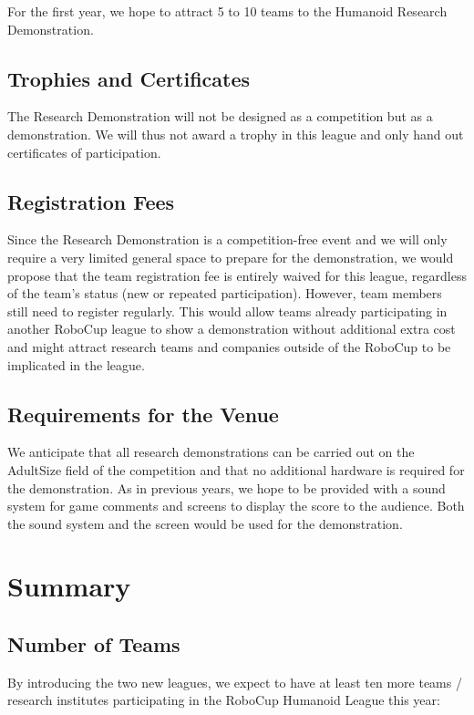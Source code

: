 \documentclass{article}
\begin{document}
For the first year, we hope to attract 5 to 10 teams to the Humanoid Research Demonstration.

\subsection{Trophies and Certificates}
The Research Demonstration will not be designed as a competition but as a demonstration. We will thus not award a trophy in this league and only hand out certificates of participation. 

\subsection{Registration Fees}

Since the Research Demonstration is a competition-free event and we will only
require a very limited general space to prepare for the demonstration,
we would propose that the team registration fee is entirely waived for this
league,
regardless of the team's status (new or repeated participation).
However, team members still need to register regularly.
This would allow teams already participating in another RoboCup league to show a
demonstration without additional extra cost and might attract research teams and
companies outside of the RoboCup to be implicated in the league. 

\subsection{Requirements for the Venue}

We anticipate that all research demonstrations can be carried out on the AdultSize field of the competition and that no additional hardware is required for the demonstration. As in previous years, we hope to be provided with a sound system for game comments and screens to display the score to the audience. Both the sound system and the screen would be used for the demonstration.
 
\section{Summary}

\subsection{Number of Teams}
By introducing the two new leagues, we expect to have at least ten more teams / research institutes participating in the RoboCup Humanoid League this year:
\end{document}
